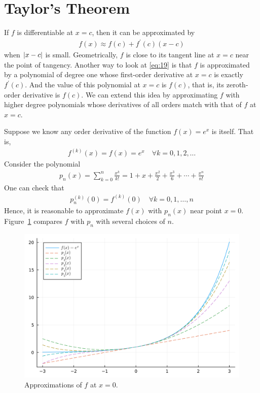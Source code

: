 \documentclass[thmcnt=section, 12pt]{my-elegantbook}
\begin{document}

\section{Taylor's Theorem}

\par If $f$ is differentiable at $x = c$, then it can be approximated by 
\begin{align}
    f(x) \approx f(c) + f^\prime(c)(x-c)
    \label{eq:19}
\end{align}
when $\left\lvert x-c \right\rvert$ is small. Geometrically, $f$ is close to its tangent line at $x=c$ near the point of tangency. Another way to look at \eqref{eq:19} is that $f$ is approximated by a polynomial of degree one whose first-order derivative at $x=c$ is exactly $f^\prime(c)$. And the value of this polynomial at $x=c$ is $f(c)$, that is, its zeroth-order derivative is $f(c)$. We can extend this idea by approximating $f$ with higher degree polynomials whose derivatives of all orders match with that of $f$ at $x = c$.

\begin{example}
    Suppose we know any order derivative of the function $f(x) = e^x$ is itself. That is,
    \begin{align*}
        f^{(k)}(x) = f(x) = e^x \quad \forall k = 0, 1, 2, \ldots
    \end{align*}
    Consider the polynomial 
    \begin{align*}
        p_n(x) 
        = \sum_{k=0}^n \frac{x^k}{k!}
        = 1 + x + \frac{x^2}{2} + \frac{x^3}{6} + \cdots + \frac{x^n}{n!}
    \end{align*}
    One can check that 
    \begin{align*}
        p^{(k)}_n(0) = f^{(k)}(0)
        \quad \forall k = 0, 1, \ldots, n
    \end{align*}
    Hence, it is reasonable to approximate $f(x)$ with $p_n(x)$ near point $x = 0$. Figure~\ref{fig:7} compares $f$ with $p_n$ with several choices of $n$.

    \begin{figure}[ht]
        \centering
        \includegraphics[scale=0.2]{figures/graph-008.png}
        \caption{Approximations of $f$ at $x=0$.}
        \label{fig:7}
    \end{figure}
\end{example}
\end{document}
